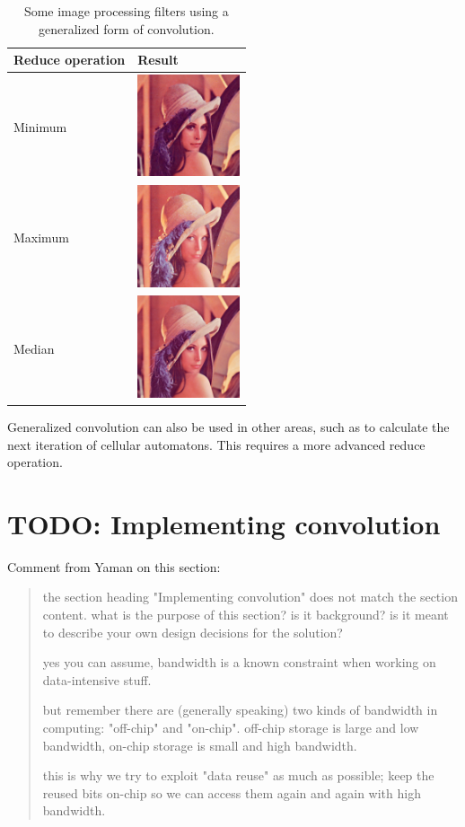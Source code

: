 \begin{table}
    \centering
    \begin{tabular}{lm{3cm}}
        Reduce operation & Result \\
        \hline
        Minimum & \includegraphics[width=3cm]{img/LenaMin} \\
        Maximum & \includegraphics[width=3cm]{img/LenaMax} \\
        Median & \includegraphics[width=3cm]{img/LenaMedian}
    \end{tabular}

    \caption{Some image processing filters using a generalized form of convolution.}
    \label{tab:GeneralizedKernelMatrices}
\end{table}

Generalized convolution can also be used in other areas, such as to calculate the next iteration of cellular automatons. This requires a more advanced reduce operation.

\section{TODO: Implementing convolution}
Comment from Yaman on this section:
\begin{quotation}
the section heading "Implementing convolution" does not match the section content. what is the purpose of this section? is it background? is it meant to describe your own design decisions for the solution?

yes you can assume, bandwidth is a known constraint when working on data-intensive stuff.

but remember there are (generally speaking) two kinds of bandwidth in computing: "off-chip" and "on-chip". off-chip storage is large and low bandwidth, on-chip storage is small and high bandwidth. 

this is why we try to exploit "data reuse" as much as possible; keep the reused bits on-chip so we can access them again and again with high bandwidth.
\end{quotation}


